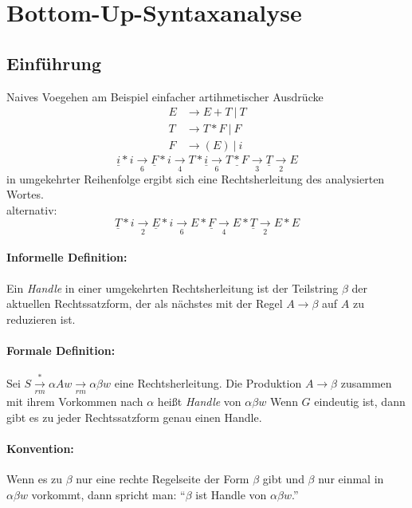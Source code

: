 \section{Bottom-Up-Syntaxanalyse}
\subsection{Einführung}
Naives Voegehen am Beispiel einfacher artihmetischer Ausdrücke
\begin{align*}
 E &\to E+T\ |\ T \tag{1. / 2.} \\
 T &\to T*F\ |\ F \tag{3. / 4.}\\
 F &\to (E)\ |\ i \tag{5. / 6.}
\end{align*}
\[                        \underline{i} * i 
\underset{6}{\rightarrow} \underline{F} * i 
\underset{4}{\rightarrow} T * \underline{i}
\underset{6}{\rightarrow} \underline{T * F}
\underset{3}{\rightarrow} \underline{T}
\underset{2}{\rightarrow} E
\]
in umgekehrter Reihenfolge ergibt sich eine Rechtsherleitung des analysierten Wortes. \\
alternativ:
\[                        \underline{T} * i
\underset{2}{\rightarrow} \underline{E} * i
\underset{6}{\rightarrow} E * \underline{F}
\underset{4}{\rightarrow} E * \underline{T}
\underset{2}{\rightarrow} E * E \tag{Sackgasse!}
\]
\paragraph*{Informelle Definition:} Ein \emph{Handle} in einer umgekehrten Rechtsherleitung ist der Teilstring $\beta$ der aktuellen Rechtssatzform, der als nächstes mit der Regel $A \to \beta$ auf $A$ zu reduzieren ist.
\paragraph*{Formale Definition:} Sei $S \underset{rm}{\xrightarrow{*}} \alpha Aw \underset{rm}{\rightarrow} \alpha \beta w$ eine Rechtsherleitung. Die Produktion $A \to \beta$ zusammen mit ihrem Vorkommen nach $\alpha$ heißt \emph{Handle} von $\alpha \beta w$
\Lemma Wenn $G$ eindeutig ist, dann gibt es zu jeder Rechtssatzform genau einen Handle.
\paragraph*{Konvention:} Wenn es zu $\beta$ nur eine rechte Regelseite der Form $\beta$ gibt und $\beta$ nur einmal in $\alpha \beta w$ vorkommt, dann spricht man: "`$\beta$ ist Handle von $\alpha \beta w$."'

